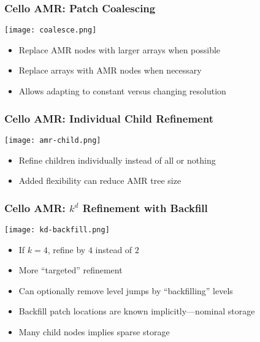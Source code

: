 \begin{frame}[fragile] \frametitle{Cello AMR: Patch Coalescing}
\centerline{\texttt{[image: coalesce.png]}}
\begin{itemize}
\item Replace AMR nodes with larger arrays when possible
\item Replace arrays with AMR nodes when necessary
\item Allows adapting to constant versus changing resolution
\end{itemize}
\end{frame}

\begin{frame}[fragile] \frametitle{Cello AMR: Individual Child Refinement}
\centerline{\texttt{[image: amr-child.png]}}
\begin{itemize}
\item Refine children individually instead of all or nothing
\item Added flexibility can reduce AMR tree size
\end{itemize}
\end{frame}

\begin{frame}[fragile] \frametitle{Cello AMR: $k^d$ Refinement with Backfill}
\centerline{\texttt{[image: kd-backfill.png]}}
\begin{itemize}
\item If $k=4$, refine by $4$ instead of $2$
\item More ``targeted'' refinement
\item Can optionally remove level jumps by ``backfilling'' levels
\item Backfill patch locations are known implicitly---nominal storage
\item Many child nodes implies sparse storage
\end{itemize}
\end{frame}
